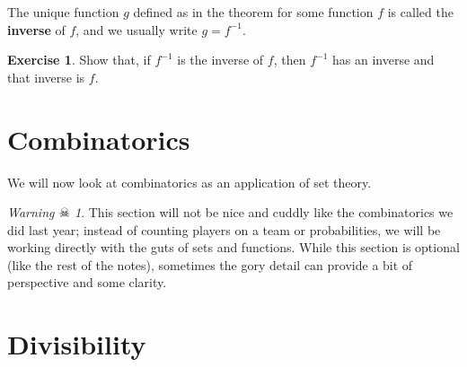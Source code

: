 \documentclass[a4paper,leqno]{article}
\numberwithin{equation}{section}
\theoremstyle{definition}
\newtheorem{exercise}[equation]{Exercise}
\theoremstyle{remark}
\newtheorem{warning}[equation]{Warning $\skull$}
\newcommand{\df}[1]{\textbf{#1}}
\begin{document}
The unique function $ g $ defined as in the theorem for some function $ f $ is called the \df{inverse} of $ f $, and we usually write $ g = f^{-1} $.

\begin{exercise}
  Show that, if $ f^{-1} $ is the inverse of $ f $, then $ f^{-1} $ has an inverse and that inverse is $ f $.
\end{exercise}

\section{Combinatorics}
We will now look at combinatorics as an application of set theory.
\begin{warning}
  This section will not be nice and cuddly like the combinatorics we did last year; instead of counting players on a team or probabilities, we
  will be working directly with the guts of sets and functions. While this section is optional (like the rest of the notes), sometimes the gory
  detail can provide a bit of perspective and some clarity.
\end{warning}

\section{Divisibility}
\end{document}
